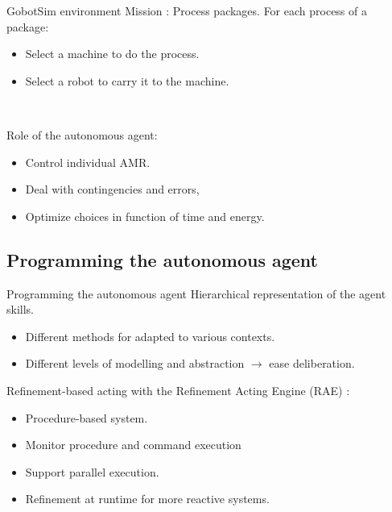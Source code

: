     

\begin{frame}{GobotSim environment}
Mission : Process packages. For each process of a package:
\begin{itemize}
    \item Select a machine to do the process.
    \item Select a robot to carry it to the machine.
\end{itemize}
~

    Role of the autonomous agent:
    \begin{itemize}
        \item Control individual AMR.
        \item Deal with contingencies and errors,
        \item Optimize choices in function of time and energy.
    \end{itemize}
\end{frame}
\subsection{Programming the autonomous agent}

\begin{frame}{Programming the autonomous agent}
    Hierarchical representation of the agent skills.
    \begin{itemize}
        \item Different methods for adapted to various contexts.
        \item Different levels of modelling and abstraction $\rightarrow$ ease deliberation.
    \end{itemize}
    Refinement-based acting with the Refinement Acting Engine (RAE) \cite{ghallabAutomatedPlanningActing2016}:
    \begin{itemize}
        \item Procedure-based system.
        \item Monitor procedure and command execution
        \item Support parallel execution.
        \item Refinement at runtime for more reactive systems.
    \end{itemize}
\end{frame}

